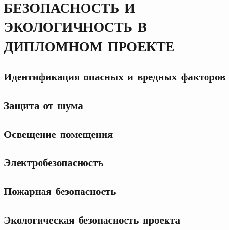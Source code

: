 \section{БЕЗОПАСНОСТЬ И ЭКОЛОГИЧНОСТЬ В ДИПЛОМНОМ ПРОЕКТЕ}
\subsection{Идентификация опасных и вредных факторов}
\subsection{Защита от шума}
\subsection{Освещение помещения}
\subsection{Электробезопасность}
\subsection{Пожарная безопасность}
\subsection{Экологическая безопасность проекта}

